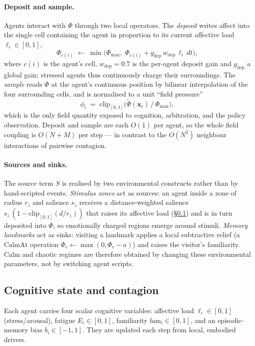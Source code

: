 \documentclass[sigconf,nonacm]{acmart}
\begin{document}
\paragraph{Deposit and sample.} Agents interact with $\Phi$ through two local operators. The \emph{deposit} writes affect into the single cell containing the agent in proportion to its current affective load $\ell_i\in[0,1]$,
\begin{equation}
\Phi_{c(i)} \;\leftarrow\; \min\!\big(\Phi_{\max},\; \Phi_{c(i)} + g_{\mathrm{dep}}\,w_{\mathrm{dep}}\,\ell_i\,dt\big),
\end{equation}
where $c(i)$ is the agent's cell, $w_{\mathrm{dep}}=0.7$ is the per-agent deposit gain and $g_{\mathrm{dep}}$ a global gain; stressed agents thus continuously charge their surroundings. The \emph{sample} reads $\Phi$ at the agent's continuous position by bilinear interpolation of the four surrounding cells, and is normalised to a unit ``field pressure''
\begin{equation}
\phi_i \;=\; \mathrm{clip}_{[0,1]}\!\big(\widetilde{\Phi}(\mathbf{x}_i)\,/\,\Phi_{\max}\big),
\end{equation}
which is the only field quantity exposed to cognition, arbitration, and the policy observation. Deposit and sample are each $O(1)$ per agent, so the whole field coupling is $O(N+M)$ per step --- in contrast to the $O(N^2)$ neighbour interactions of pairwise contagion.

\paragraph{Sources and sinks.} The source term $S$ is realised by two environmental constructs rather than by hand-scripted events. \emph{Stimulus zones} act as sources: an agent inside a zone of radius $r_z$ and salience $s_z$ receives a distance-weighted salience $s_z\,(1-\mathrm{clip}_{[0,1]}(d/r_z))$ that raises its affective load (\S\ref{sub:cog}) and is in turn deposited into $\Phi$, so emotionally charged regions emerge around stimuli. \emph{Memory landmarks} act as sinks: visiting a landmark applies a local subtractive relief (a $\mathrm{CalmAt}$ operation $\Phi_{c}\!\leftarrow\!\max(0,\Phi_{c}-a)$) and raises the visitor's familiarity. Calm and chaotic regimes are therefore obtained by changing these environmental parameters, not by switching agent scripts.

\subsection{Cognitive state and contagion}
\label{sub:cog}
Each agent carries four scalar cognitive variables: affective load $\ell_i\in[0,1]$ (stress/arousal), fatigue $E_i\in[0,1]$, familiarity $\mathrm{fam}_i\in[0,1]$, and an episodic-memory bias $b_i\in[-1,1]$. They are updated each step from local, embodied drivers.
\end{document}
